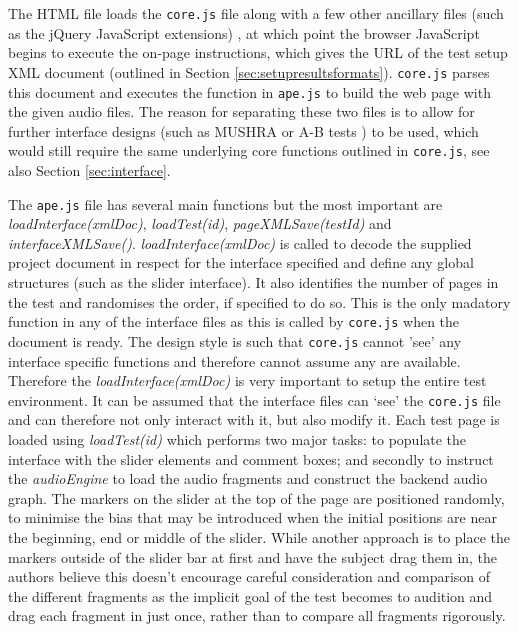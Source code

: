 \documentclass{article}
\begin{document}
The HTML file loads the \texttt{core.js} file along with a few other ancillary files (such as the jQuery JavaScript extensions)%
, at which point the browser JavaScript begins to execute the on-page instructions, which gives the URL of the test setup XML document (outlined in Section \ref{sec:setupresultsformats}). \texttt{core.js} parses this document and executes the function in \texttt{ape.js} to build the web page with the given audio files. The reason for separating these two files is to allow for further interface designs (such as MUSHRA \cite{mushra} or A-B tests \cite{bech}) to be used, which would still require the same underlying core functions outlined in \texttt{core.js}, see also Section \ref{sec:interface}.

The \texttt{ape.js} file has several main functions but the most important are \textit{loadInterface(xmlDoc)}, \textit{loadTest(id)}, \textit{pageXMLSave(testId)} and \textit{interfaceXMLSave()}. \textit{loadInterface(xmlDoc)} is called to decode the supplied project document in respect for the interface specified and define any global structures (such as the slider interface). It also identifies the number of pages in the test and randomises the order, if specified to do so. This is the only madatory function in any of the interface files as this is called by \texttt{core.js} when the document is ready. The design style is such that \texttt{core.js} cannot 'see' any interface specific functions and therefore cannot assume any are available. Therefore the \textit{loadInterface(xmlDoc)} is very important to setup the entire test environment. It can be assumed that the interface files can `see' the \texttt{core.js} file and can therefore not only interact with it, but also modify it.
Each test page is loaded using \textit{loadTest(id)} which performs two major tasks: to populate the interface with the slider elements and comment boxes; and secondly to instruct the \textit{audioEngine} to load the audio fragments and construct the backend audio graph. The markers on the slider at the top of the page are positioned randomly, to minimise the bias that may be introduced when the initial positions are near the beginning, end or middle of the slider. While another approach is to place the markers outside of the slider bar at first and have the subject drag them in, the authors believe this doesn't encourage careful consideration and comparison of the different fragments as the implicit goal of the test becomes to audition and drag each fragment in just once, rather than to compare all fragments rigorously.
\end{document}
